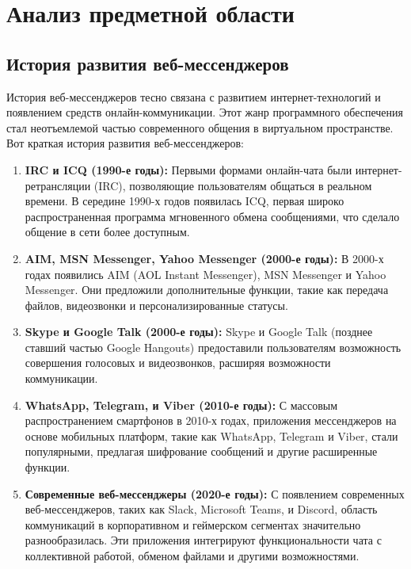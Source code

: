 \section{Анализ предметной области}
\subsection{История развития веб-мессенджеров}

История веб-мессенджеров тесно связана с развитием интернет-технологий и появлением средств онлайн-коммуникации. Этот жанр программного обеспечения стал неотъемлемой частью современного общения в виртуальном пространстве. Вот краткая история развития веб-мессенджеров:

\begin{enumerate}
	\item \textbf{IRC и ICQ (1990-е годы):} Первыми формами онлайн-чата были интернет-ретрансляции (IRC), позволяющие пользователям общаться в реальном времени. В середине 1990-х годов появилась ICQ, первая широко распространенная программа мгновенного обмена сообщениями, что сделало общение в сети более доступным.
	
	\item \textbf{AIM, MSN Messenger, Yahoo Messenger (2000-е годы):} В 2000-х годах появились AIM (AOL Instant Messenger), MSN Messenger и Yahoo Messenger. Они предложили дополнительные функции, такие как передача файлов, видеозвонки и персонализированные статусы.
	
	\item \textbf{Skype и Google Talk (2000-е годы):} Skype и Google Talk (позднее ставший частью Google Hangouts) предоставили пользователям возможность совершения голосовых и видеозвонков, расширяя возможности коммуникации.
	
	\item \textbf{WhatsApp, Telegram, и Viber (2010-е годы):} С массовым распространением смартфонов в 2010-х годах, приложения мессенджеров на основе мобильных платформ, такие как WhatsApp, Telegram и Viber, стали популярными, предлагая шифрование сообщений и другие расширенные функции.
	
	\item \textbf{Современные веб-мессенджеры (2020-е годы):} С появлением современных веб-мессенджеров, таких как Slack, Microsoft Teams, и Discord, область коммуникаций в корпоративном и геймерском сегментах значительно разнообразилась. Эти приложения интегрируют функциональности чата с коллективной работой, обменом файлами и другими возможностями.
	
\end{enumerate}

